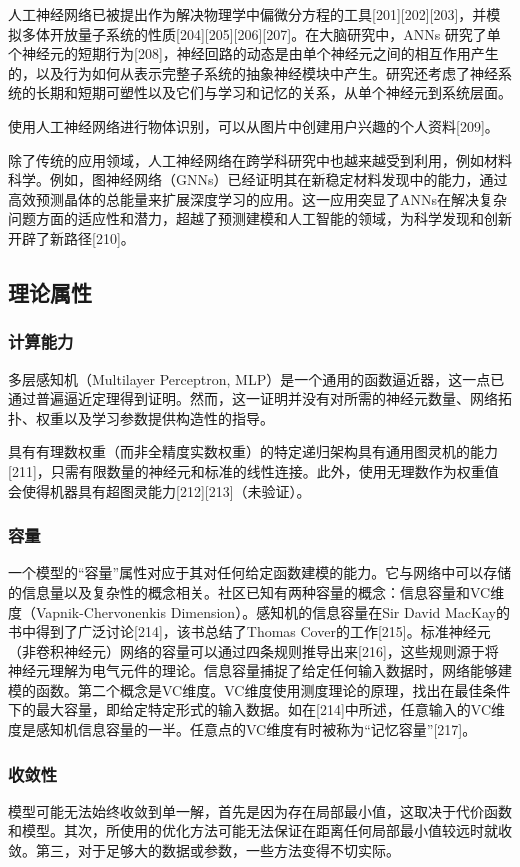 人工神经网络已被提出作为解决物理学中偏微分方程的工具[201][202][203]，并模拟多体开放量子系统的性质[204][205][206][207]。在大脑研究中，ANNs 研究了单个神经元的短期行为[208]，神经回路的动态是由单个神经元之间的相互作用产生的，以及行为如何从表示完整子系统的抽象神经模块中产生。研究还考虑了神经系统的长期和短期可塑性以及它们与学习和记忆的关系，从单个神经元到系统层面。

使用人工神经网络进行物体识别，可以从图片中创建用户兴趣的个人资料[209]。

除了传统的应用领域，人工神经网络在跨学科研究中也越来越受到利用，例如材料科学。例如，图神经网络（GNNs）已经证明其在新稳定材料发现中的能力，通过高效预测晶体的总能量来扩展深度学习的应用。这一应用突显了ANNs在解决复杂问题方面的适应性和潜力，超越了预测建模和人工智能的领域，为科学发现和创新开辟了新路径[210]。
\subsection{理论属性}
\subsubsection{计算能力}  
多层感知机（Multilayer Perceptron, MLP）是一个通用的函数逼近器，这一点已通过普遍逼近定理得到证明。然而，这一证明并没有对所需的神经元数量、网络拓扑、权重以及学习参数提供构造性的指导。

具有有理数权重（而非全精度实数权重）的特定递归架构具有通用图灵机的能力[211]，只需有限数量的神经元和标准的线性连接。此外，使用无理数作为权重值会使得机器具有超图灵能力[212][213]（未验证）。
\subsubsection{容量} 
一个模型的“容量”属性对应于其对任何给定函数建模的能力。它与网络中可以存储的信息量以及复杂性的概念相关。社区已知有两种容量的概念：信息容量和VC维度（Vapnik-Chervonenkis Dimension）。感知机的信息容量在Sir David MacKay的书中得到了广泛讨论[214]，该书总结了Thomas Cover的工作[215]。标准神经元（非卷积神经元）网络的容量可以通过四条规则推导出来[216]，这些规则源于将神经元理解为电气元件的理论。信息容量捕捉了给定任何输入数据时，网络能够建模的函数。第二个概念是VC维度。VC维度使用测度理论的原理，找出在最佳条件下的最大容量，即给定特定形式的输入数据。如在[214]中所述，任意输入的VC维度是感知机信息容量的一半。任意点的VC维度有时被称为“记忆容量”[217]。
\subsubsection{收敛性}
模型可能无法始终收敛到单一解，首先是因为存在局部最小值，这取决于代价函数和模型。其次，所使用的优化方法可能无法保证在距离任何局部最小值较远时就收敛。第三，对于足够大的数据或参数，一些方法变得不切实际。


